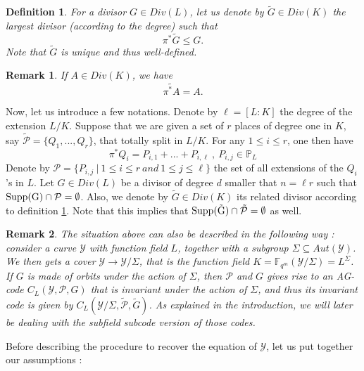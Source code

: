 \documentclass[10pt]{article}
\newtheorem{def1}{Definition}[]
\newtheorem{rq1}{Remark}[]
\newcommand{\s}{\vspace{0.3cm}}
\newcommand{\fqm}{\mathbb{F}_{q^m}}
\newcommand{\su}{\subseteq}
\newcommand{\Y}{\mathcal{Y}}
\newcommand{\PR}{\mathcal{P}}
\begin{document}
\s

\begin{def1} \label{pousséavant}
For a divisor $G \in Div(L)$, let us denote by $\tilde{G} \in Div(K)$ the largest divisor (according to the degree) such that
\[\pi^*\tilde{G} \leq G.\]
Note that $\tilde{G}$ is unique and thus well-defined.
\end{def1} 

\s 

\begin{rq1} \label{jsp}
If $A \in Div(K)$, we have 
\[\widetilde{\pi^*A}=A.\]
\end{rq1}

\s

Now, let us introduce a few notations. Denote by $\ell=[L:K]$ the degree of the extension $L/K$. Suppose that we are given a set of $r$ places of degree one in $K$, say $\tilde{\PR} = \{Q_1,...,Q_r\}$, that totally split in $L/K$. For any $1 \leq i \leq r$, one then have 
\[\pi^*Q_i = P_{i,1} + ... + P_{i,\ell} \ , \ P_{i,j} \in \mathbb{P}_L\]
Denote by $\PR = \{P_{i,j} \ | \ 1 \leq i \leq r \ and \ 1 \leq j \leq \ell\}$ the set of all extensions of the $Q_i$'s in $L$. Let $G \in Div(L)$ be a divisor of degree $d$ smaller that $n=\ell r$ such that $\rm{Supp}(G) \cap \PR = \emptyset$. Also, we denote by $\tilde{G} \in Div(K)$ its related divisor according to definition \ref{pousséavant}.
Note that this implies that $\rm{Supp}(\tilde{G}) \cap \tilde{\PR} = \emptyset$ as well. 

\s

\begin{rq1} \rm
The situation above can also be described in the following way : consider a curve $\Y$ with function field $L$, together with a subgroup $\Sigma \su Aut(\Y)$. We then gets a cover $\Y \rightarrow \Y/\Sigma$, that is the function field $K = \fqm(\Y/\Sigma) = L^{\Sigma}$. If $G$ is made of orbits under the action of $\Sigma$, then $\PR$ and $G$ gives rise to an AG-code $C_L(\Y,\PR,G)$ that is invariant under the action of $\Sigma$, and thus its invariant code is given by $C_L(\Y/\Sigma,\tilde{\PR},\tilde{G})$. As explained in the introduction, we will later be dealing with the subfield subcode version of those codes.  
\end{rq1}

\s

Before describing the procedure to recover the equation of $\Y$, let us put together our assumptions :
\end{document}
